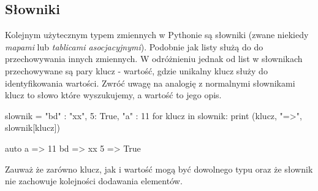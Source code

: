 % 
% 
% 
% 

\subsection{Słowniki}

Kolejnym użytecznym typem zmiennych w Pythonie są słowniki (zwane niekiedy \emph{mapami} lub \emph{tablicami asocjacyjnymi}). Podobnie jak listy służą do do przechowywania innych zmiennych.
W odróżnieniu jednak od list w słownikach przechowywane są pary klucz - wartość, gdzie unikalny klucz służy do identyfikowania wartości.
Zwróć uwagę na analogię z normalnymi słownikami klucz to słowo które wyszukujemy, a wartość to jego opis.

\begin{CodeFrame}[python]{0.60\textwidth}
slownik = { "bd" : "xx", 5: True, "a" : 11 }
for klucz in slownik:
    print (klucz, "=>", slownik[klucz])
\end{CodeFrame}
\begin{CodeFrame}{auto}
a => 11
bd => xx
5 => True
\end{CodeFrame}

Zauważ że zarówno klucz, jak i wartość mogą być dowolnego typu oraz że słownik nie zachowuje kolejności dodawania elementów.

